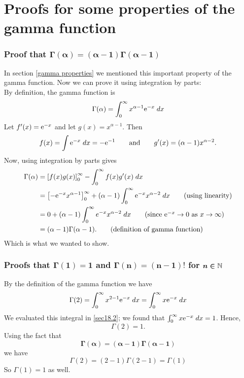 \section{Proofs for some properties of the gamma function} \label{sec18.1}
\subsubsection{Proof that $\boldsymbol{\Gamma(\alpha) = (\alpha-1)\Gamma(\alpha-1)}$} 
In section \ref{gamma properties} we mentioned this important property of the gamma function. Now we can prove it using integration by parts: \\

\noindent By definition, the gamma function is
\[
\Gamma(\alpha) = \int_0^\infty x^{\alpha - 1}\mathrm{e}^{-x} \; dx
\]
Let $f'(x) = \mathrm{e}^{-x}$ and let $g(x) = x^{\alpha - 1}$. Then
\[
f(x) = \int \mathrm{e}^{-x} \; dx = -\mathrm{e}^{-1} \qquad \text{and} \qquad g'(x) = (\alpha - 1)x^{\alpha - 2}.
\]
Now, using integration by parts gives
\begin{align*}
\Gamma(\alpha) & = \squac{f(x)g(x)}_0^\infty - \int_0^\infty f(x)g'(x) \; dx \\
	& = \squac{-\e^{-x}x^{\alpha - 1}}_0^\infty + (\alpha - 1)\int_0^\infty \e^{-x}x^{\alpha - 2} \; dx \tag{using linearity}\\
	& = 0 + (\alpha - 1)\int_0^\infty e^{-x}x^{\alpha - 2} \; dx \tag{since $\e^{-x} \rightarrow 0$ as $x \rightarrow \infty$} \\
	& = (\alpha - 1)\Gamma(\alpha - 1). \tag{definition of gamma function}
\end{align*}
Which is what we wanted to show.

\subsubsection{Proofs that $\boldsymbol{\Gamma(1) = 1}$ and $\boldsymbol{\Gamma(n) = (n-1)!}$ for $\boldsymbol{n \in \mathbb{N}}$}
By the definition of the gamma function we have
\[
\Gamma(2) = \int_0^\infty x^{2-1}\mathrm{e}^{-x} \; dx = \int_0^\infty x\mathrm{e}^{-x} \; dx
\]
We evaluated this integral in \ref{sec18.2}; we found that $\int_0^\infty x\mathrm{e}^{-x} \; dx = 1$. Hence,
\[
\Gamma(2) = 1.
\]
Using the fact that 
\[
\boldsymbol{\Gamma(\alpha) = (\alpha - 1)\Gamma(\alpha - 1)} \tag{$\bigstar$}
\]
we have
\[
\Gamma(2) = (2-1)\Gamma(2-1) = \Gamma(1)
\]
So $\Gamma(1) = 1$ as well. \\

